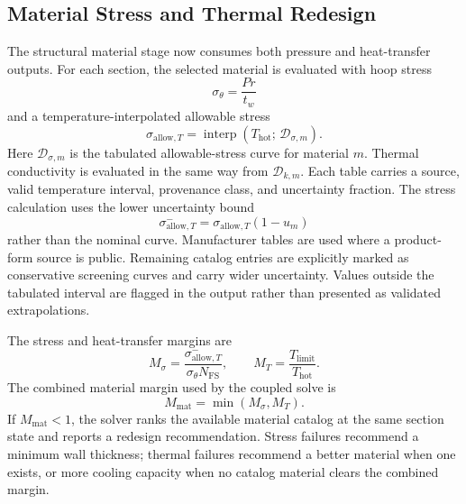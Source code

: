 \documentclass[11pt]{article}
\begin{document}
\subsection{Material Stress and Thermal Redesign}
The structural material stage now consumes both pressure and heat-transfer outputs. For each section, the selected material is evaluated with hoop stress
\begin{equation}
\sigma_\theta=\frac{Pr}{t_w}
\label{eq:material-hoop-stress}
\end{equation}
and a temperature-interpolated allowable stress
\begin{equation}
\sigma_{\mathrm{allow},T}=\operatorname{interp}\!\left(T_{\mathrm{hot}};\,\mathcal{D}_{\sigma,m}\right).
\label{eq:material-derated-stress}
\end{equation}
Here $\mathcal{D}_{\sigma,m}$ is the tabulated allowable-stress curve for material $m$. Thermal conductivity is evaluated in the same way from $\mathcal{D}_{k,m}$. Each table carries a source, valid temperature interval, provenance class, and uncertainty fraction. The stress calculation uses the lower uncertainty bound
\begin{equation}
\sigma_{\mathrm{allow},T}^{-}=\sigma_{\mathrm{allow},T}(1-u_m)
\label{eq:material-allowable-lower}
\end{equation}
rather than the nominal curve. Manufacturer tables are used where a product-form source is public. Remaining catalog entries are explicitly marked as conservative screening curves and carry wider uncertainty. Values outside the tabulated interval are flagged in the output rather than presented as validated extrapolations.

The stress and heat-transfer margins are
\begin{equation}
M_\sigma=\frac{\sigma_{\mathrm{allow},T}^{-}}{\sigma_\theta N_{\mathrm{FS}}},
\qquad
M_T=\frac{T_{\mathrm{limit}}}{T_{\mathrm{hot}}}.
\label{eq:stress-heat-margins}
\end{equation}
The combined material margin used by the coupled solve is
\begin{equation}
M_{\mathrm{mat}}=\min(M_\sigma,M_T).
\label{eq:combined-material-margin}
\end{equation}
If $M_{\mathrm{mat}}<1$, the solver ranks the available material catalog at the same section state and reports a redesign recommendation. Stress failures recommend a minimum wall thickness; thermal failures recommend a better material when one exists, or more cooling capacity when no catalog material clears the combined margin.
\end{document}
